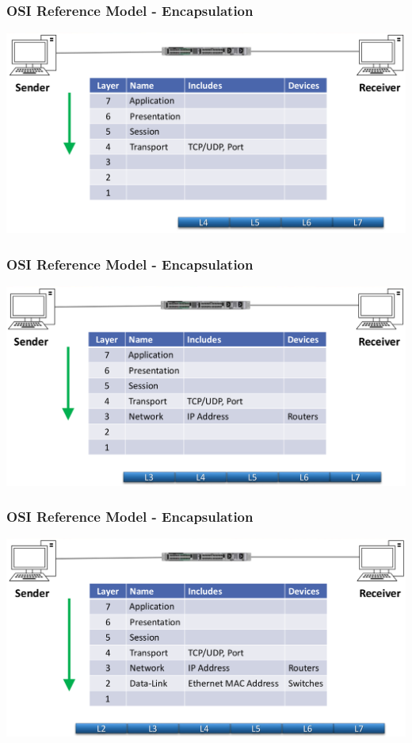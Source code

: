 \documentclass[pdflatex,compress]{beamer}
\begin{document}
\begin{frame}
	\frametitle{OSI Reference Model - Encapsulation}
	\begin{center}
		\includegraphics[width=\linewidth]{img/img05}
	\end{center}
\end{frame}

\begin{frame}
	\frametitle{OSI Reference Model - Encapsulation}
	\begin{center}
		\includegraphics[width=\linewidth]{img/img06}
	\end{center}
\end{frame}

\begin{frame}
	\frametitle{OSI Reference Model - Encapsulation}
	\begin{center}
		\includegraphics[width=\linewidth]{img/img07}
	\end{center}
\end{frame}
\end{document}
